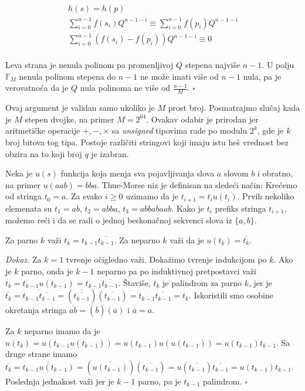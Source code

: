 \begin{gather*}
h(s) = h(p) \\
\sum_{i=0}^{n-1}f(s_i)Q^{n-1-i} \equiv  \sum_{i=0}^{n-1}f(p_i)Q^{n-1-i} \\
\sum_{i=0}^{n-1}(f(s_i)-f(p_i))Q^{n-1-i} \equiv 0 \\
\end{gather*}

Leva strana je nenula polinom pa promenljivoj $Q$ stepena najvi\v se $n-1$. U polju $\mathbb{F}_M$ nenula polinom stepena do $n-1$ ne mo\v ze imati vi\v se od $n-1$ nula, pa je verovatno\' ca da je $Q$ nula polinoma ne vi\v se od $\frac{n-1}{M}$. \hfill $\square$

Ovaj argument je validan samo ukoliko je $M$ prost broj. Posmatrajmo slu\v caj kada je $M$ stepen dvojke, na primer $M = 2^{64}$. Ovakav odabir je prirodan jer aritmeti\v cke operacije $+,-,\times$ sa \textit{unsigned} tipovima rade po modulu $2^k$, gde je $k$ broj bitova tog tipa. Postoje razli\v citi stringovi koji imaju istu he\v s vrednost bez obzira na to koji broj $q$ je izabran.

Neka je $u(s)$ funkcija koja menja sva pojavljivanja slova $a$ slovom $b$ i obratno, na primer $u(aab) = bba$. Thue-Morse niz\cite{thuemorserad} je definisan na slede\' ci na\v cin: Kre\' cemo od stringa $t_0 = a$. Za svako $i \geq 0$ uzimamo da je $t_{i+1} = t_iu(t_i)$. Prvih nekoliko elemenata su $t_1 = ab$, $t_2 = abba$, $t_3 = abbabaab$. Kako je $t_i$ prefiks stringa $t_{i+1}$, mo\v zemo re\' ci i da se radi o jednoj beskona\v cnoj sekvenci slova iz $\{a,b\}$.

\begin{thm}
\label{thuemorseosobina}
Za parno $k$ va\v zi $t_k = t_{k-1}\overline{t_{k-1}}$. Za neparno $k$ va\v zi da je $u(t_{k}) = \overline{t_{k}}$.
\end{thm}

\textit{Dokaz.} Za $k=1$ tvr\dj enje o\v cigledno va\v zi. Doka\v zimo tvr\dj enje indukcijom po $k$. Ako je $k$ parno, onda je $k-1$ neparno pa po induktivnoj pretpostavci va\v zi $t_k = t_{k-1}u(t_{k-1}) = t_{k-1}\overline{t_{k-1}}$. \v Stavi\v se, $t_k$ je palindrom za parno $k$, jer je $\overline{t_k} = \overline{t_{k-1}\overline{t_{k-1}}} = (\overline{\overline{t_{k-1}}})(\overline{t_{k-1}}) = t_{k-1}\overline{t_{k-1}} = t_k$. Iskoristili smo osobine okretanja stringa $\overline{ab} = (\overline{b})(\overline{a})$ i $\overline{\overline{a}} = a$.

Za $k$ neparno imamo da je $u(t_{k}) = u(t_{k-1}u(t_{k-1})) = u(t_{k-1})u(u(t_{k-1})) = u(t_{k-1})t_{k-1}$. Sa druge strane imamo $\overline{t_k} = \overline{t_{k-1}u(t_{k-1})} = (\overline{u(t_{k-1})})(\overline{t_{k-1}}) = u(\overline{t_{k-1}})\overline{t_{k-1}} = u(t_{k-1})t_{k-1}$. Poslednja jednakost va\v zi jer je $k-1$ parno, pa je $t_{k-1}$ palindrom. \hfill $\square$

